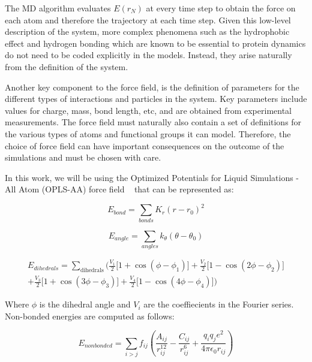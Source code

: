 The MD algorithm evaluates $E(r_{N})$ at every time step to obtain the force on each atom and therefore the trajectory at each time step. Given this low-level description of the system, more complex phenomena such as the hydrophobic effect and hydrogen bonding which are known to be essential to protein dynamics do not need to be coded explicitly in the models. Instead, they arise naturally from the definition of the system.

Another key component to the force field, is the definition of parameters for the different types of interactions and particles in the system. Key parameters include values for charge, mass, bond length, etc, and are obtained from experimental measurements. The force field must naturally also contain a set of definitions for the various types of atoms and functional groups it can model. Therefore, the choice of force field can have important consequences on the outcome of the simulations and must be chosen with care.

In this work, we will be using the Optimized Potentials for Liquid Simulations - All Atom (OPLS-AA) force field ~\cite{jorgensen1988opls} that can be represented as:


\begin{equation}
E_{bond} = \sum_{bonds} K_{r} (r - r_{0})^2	
\end{equation}

\begin{equation}
 E_{angle} = \sum_{angles} k_{\theta} (\theta - \theta_0) 
\end{equation}

\begin{multline}
E_{dihedrals} = \sum_\mathrm{dihedrals} \Big( \frac {V_1} {2} \big[ 1 + \cos (\phi-\phi_1) \big] 
                + \frac {V_2} {2} \big[ 1 - \cos (2\phi-\phi_2) \big] \\
                + \frac {V_3} {2} \big[ 1 + \cos (3\phi-\phi_3) \big] 
                + \frac {V_4} {2} \big[ 1 - \cos (4\phi-\phi_4) \big] \Big)
\end{multline}

Where $\phi$ is the dihedral angle and $V_{i}$ are the coeffiecients in the Fourier series. Non-bonded energies are computed as follows:

\begin{equation}
E_{nonbonded} = \sum_{i>j} f_{ij} \left(
                    \frac {A_{ij}}{r_{ij}^{12}} - \frac {C_{ij}}{r_{ij}^6}
                    + \frac {q_iq_j e^2}{4\pi\epsilon_0 r_{ij}} \right)
\end{equation}

